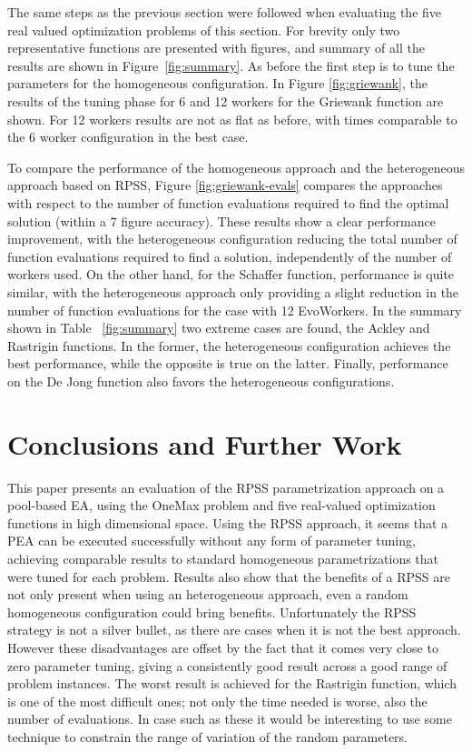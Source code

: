 \documentclass[conference]{IEEEtran}
\begin{document}
The same steps as the previous section were followed when evaluating the five real valued
optimization problems of this section.  For brevity only two representative functions are
presented with figures, and summary of all the results are shown in Figure~\ref{fig:summary}. As before
the first step is to tune the parameters for the homogeneous configuration.
In Figure \ref{fig:griewank}, the results of the tuning phase for 6 and 12 workers
for the Griewank function are shown. For 12 workers results are not as flat as before,
with times comparable to the 6 worker configuration in the best case.

To compare the performance of the homogeneous approach and the heterogeneous approach based on RPSS,
Figure \ref{fig:griewank-evals} compares the approaches with respect to the number of function evaluations required to find the optimal solution (within a 7 figure accuracy).
These results show a clear performance improvement, with the heterogeneous configuration
reducing the total number of function evaluations required to find a solution,
independently of the number of workers used.
On the other hand, for the Schaffer function, performance is quite similar,
with the heterogeneous approach only providing a slight reduction in the number
of function evaluations for the case with 12 EvoWorkers.
In the summary shown in Table ~\ref{fig:summary} two extreme cases are found, the Ackley and Rastrigin functions.
In the former, the heterogeneous configuration achieves the best performance, while the opposite is true on the latter.
Finally, performance on the De Jong function also favors the heterogeneous configurations.

\section{Conclusions and Further Work}
\label{sec:conclusions}
This paper presents an evaluation of the RPSS parametrization approach on
a pool-based EA, using the OneMax problem and five real-valued optimization functions
in high dimensional space.
Using the RPSS approach, it seems that a PEA can be executed successfully
without any form of parameter tuning, achieving comparable results to standard homogeneous
parametrizations that were tuned for each problem.
Results also show that the benefits of a RPSS are not only present
when using an heterogeneous approach, even a random homogeneous configuration could bring
benefits. Unfortunately the RPSS strategy is not a silver bullet, as there are cases
when it is not the best approach. However these disadvantages are
offset by the fact that it comes very close to zero parameter tuning,
giving a consistently good result across a good range of problem instances.
The worst result is achieved for the Rastrigin function, which
is one of the most difficult ones; not only the time needed is worse,
also the number of evaluations. In case such as these it would be
interesting to use some technique to constrain the range of variation
of the random parameters.
\end{document}
